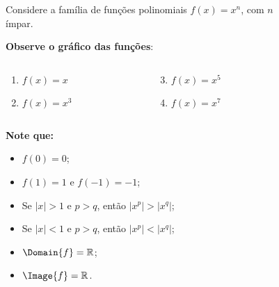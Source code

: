 \begin{frame}
  \begin{columns}[onlytextwidth]
    \begin{column}{0.49\textwidth}
      \vspace*{-0.35cm}
      \begin{example}
        Considere a família de funções polinomiais $f(x)=x^{n}$, com $n$ ímpar.
      \end{example}
      \textbf{Observe o gráfico das funções}:
      \vspace*{-0.5cm}
      \begin{columns}[onlytextwidth]
        \begin{column}{0.5\textwidth}
          \begin{enumerate}
            \item< 1- > $f(x)=x$
            \item< 2- > $f(x)=x^{3}$
          \end{enumerate}
        \end{column}
        \begin{column}{0.5\textwidth}
          \begin{enumerate}
            \setcounter{enumi}{2}
            \item< 3- > $f(x)=x^{5}$
            \item< 4- > $f(x)=x^{7}$
          \end{enumerate}
        \end{column}
      \end{columns}
      \vspace*{0.35cm}
      \begin{highlight}
        \textbf{Note que:}
        \begin{itemize}
          \item< 1- > $f(0)=0$;
          \item< 1- > $f(1) = 1$ e $f(-1)=-1$;
          \item< 4- > Se $|x| > 1$ e $p>q$, então $|x^{p}| > |x^{q}|$;
          \item< 4- > Se $|x| < 1$ e $p>q$, então $|x^{p}| < |x^{q}|$;
          \item< 4- > $\Domain{f}=\mathbb{R}$;
          \item< 4- > $\Image{f}=\mathbb{R}$.
        \end{itemize}
      \end{highlight}
    \end{column}
    \begin{column}{0.49\textwidth}
        \begin{figure}
      \end{figure}
    \end{column}
  \end{columns}
\end{frame}